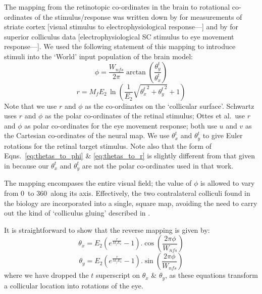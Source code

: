 \documentclass{frontiersSCNS}
\begin{document}
The mapping from the retinotopic co-ordinates in the brain to
rotational co-ordinates of the stimulus/response was written down by
\cite{schwartz_spatial_1977,eric_l._schwartz_computational_1980}
for measurements of striate cortex [visual stimulus to
electrophysiological response---\cite{daniel_representation_1961,
talbot_physiological_1941}] and by \cite{ottes_visuomotor_1986} for
superior colliculus data [electrophysiological SC stimulus to eye
movement response---\cite{robinson_eye_1972}].
We used the following statement of this mapping to introduce stimuli
into the `World' input population of the brain model:
\begin{equation}\label{eq:thetas_to_phi}
   \phi = \frac{W_{nfs}} {2 \pi}\arctan\left(\frac{\theta_{y}^{t}}{\theta_{x}^{t}}\right)
\end{equation}
\begin{equation}\label{eq:thetas_to_r}
   r = M_fE_2\,\ln\left(\frac{1}{E_2}\sqrt{{\theta_{x}^{t}}^2 + {\theta_{y}^{t}}^2}+1\right)
\end{equation}
Note that we use $r$ and $\phi$ as the co-ordinates on the `collicular
surface'. Schwartz uses $r$ and $\phi$ as the polar co-ordinates of the
retinal stimulus; Ottes et al.~use $r$ and $\phi$ as polar co-ordinates
for the eye movement response; both use $u$ and $v$ as the Cartesian
co-ordinates of the neural map. We use $\theta_{x}^{t}$ and
$\theta_{y}^{t}$ to give Euler rotations for the retinal target
stimulus. Note also that the form of
Eqns.~\ref{eq:thetas_to_phi} \& \ref{eq:thetas_to_r} is slightly
different from that given in
\cite{ottes_visuomotor_1986} because our $\theta_{x}^{t}$ and
$\theta_{y}^{t}$ are not the polar co-ordinates used in that work.

The mapping encompases the entire visual field; the value of $\phi$ is
allowed to vary from 0\dg~to 360\dg~along its axis.  Effectively, the
two contralateral colliculi found in the biology are incorporated into
a single, square map, avoiding the need to carry out the kind of
`colliculus gluing' described in \cite{tabareau_geometry_2007}.

It is straightforward to show that the reverse mapping is given by:
\begin{equation}
   \theta_x = E_2 \left(e^{\frac{r}{M_f E_2}} - 1\right).\cos\left(\frac{2 \pi \phi}{W_{nfs}}\right)
\end{equation}
\begin{equation}
   \theta_y = E_2 \left(e^{\frac{r}{M_f E_2}} - 1\right).\sin\left(\frac{2 \pi \phi}{W_{nfs}}\right)
\end{equation}
where we have dropped the $t$ superscript on $\theta_x$ \& $\theta_y$,
as these equations transform a collicular location into rotations of
the eye.
\end{document}
